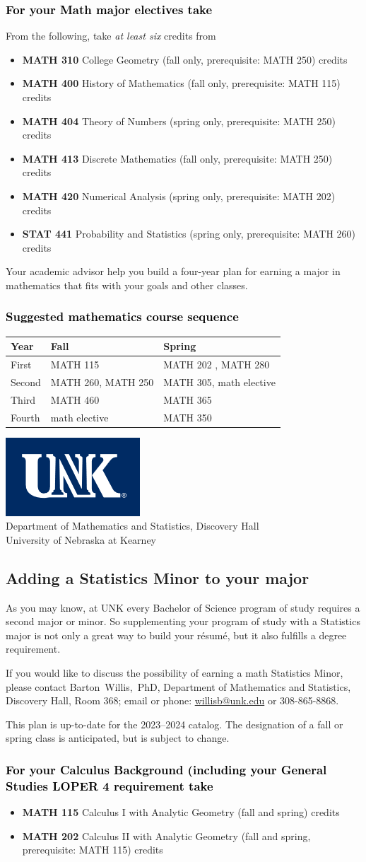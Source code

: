 \documentclass[11pt]{article}
\makeatletter
\newcommand{\calcone}{\textbf{MATH 115} Calculus I with Analytic Geometry (fall and spring) \dotfill 5 credits}
\newcommand{\calconeshort}{MATH 115}
\newcommand{\calctwo}{\textbf{MATH 202} Calculus II with Analytic Geometry (fall and spring, prerequisite: MATH 115) \dotfill 5 credits }
\newcommand{\calctwoshort}{MATH 202}
\newcommand{\foundationsshort}{MATH 250}
\newcommand{\calcthreeshort}{MATH 260}
\newcommand{\linearshort}{MATH 280}
\newcommand{\discrete}{\textbf{MATH 413} Discrete Mathematics  (fall only, prerequisite: MATH 250)\dotfill 3 credits}
\newcommand{\statistics}{\textbf{STAT 441} Probability and Statistics (spring only, prerequisite: MATH 260)  \dotfill  3 credits}
\newcommand{\diffeqshort}{MATH 305}
\newcommand{\abstractalgebrashort}{MATH 350}
\newcommand{\complexshort}{MATH 365}
\newcommand{\advancedcalcshort}{MATH 460}
\newcommand{\numerical}{\textbf{MATH 420}   Numerical Analysis   (spring only, prerequisite: MATH 202)\dotfill 3 credits}
\newcommand{\collegegeometry}{\textbf{MATH 310}	College Geometry (fall only,  prerequisite: MATH 250) \dotfill 3 credits}
\newcommand{\mathhistory}{\textbf{MATH 400} History of Mathematics (fall only,  prerequisite: MATH 115) \dotfill 3 credits}
\newcommand{\numbertheory}{\textbf{MATH 404} Theory of Numbers (spring only,  prerequisite: MATH 250) \dotfill 3 credits}
\newcommand{\contactbw}{\mbox{Barton Willis, PhD}, Department of Mathematics and Statistics,  Discovery Hall, Room 368;
email or phone: \href{mailto:willisb@unk.edu}{willisb@unk.edu} or 308-865-8868.}
\newcommand{\forinfo}[2]{If you would like to discuss the possibility of earning a math {#1}, please contact \contactbw}
\newcommand{\catalog}{2023--2024 }
\newcommand{\LOPER}{LOPER\xspace}
\newcommand{\uptodate}{This plan is up-to-date for  the \catalog catalog. The designation of a fall or spring class is 
anticipated, but  is subject to change.}
\newcommand{\myheading}{
\begin{flushleft}
\includegraphics[scale=0.35]{unk-logo}\\
\setcounter{footnote}{0}
\vspace{0.25in}
 \textcolor{unkblue}{Department of Mathematics and Statistics, Discovery Hall} \\
  \textcolor{unkblue}{University of Nebraska at Kearney}
\end{flushleft}}
\newcommand{\mathBS}{
     \begin{center}
         \begin{tabular}[h]{| l | l | l|} 
            \hline
            \textbf{Year}           & \textbf{Fall}         &  \textbf{Spring}  \\ \hline 
            First & \calconeshort{}  & \calctwoshort{} , \linearshort  \\  \hline
            Second &  \calcthreeshort{}, \foundationsshort & \diffeqshort, math elective \\ \hline
            Third & \advancedcalcshort              &  \complexshort{}\\ \hline
            Fourth & math elective &  \abstractalgebrashort  \\ \hline
         \end{tabular}
\end{center}}
\makeatother
\begin{document}
\subsubsection*{\textcolor{black}{For your Math major electives take}}
From the following, take \emph{at least six} credits from
\begin{itemize}
\item \collegegeometry
\item \mathhistory
\item \numbertheory
\item \discrete
\item \numerical
\item \statistics
\end{itemize}
\vspace{0.0in}
\noindent Your academic advisor help you build a four-year plan for earning a 
major in mathematics that fits with your goals and other classes.

\subsubsection*{\textcolor{black}{Suggested mathematics course sequence}}

\mathBS

\newpage 
\myheading
\subsection*{\textbf{\textcolor{unkblue}{Adding a Statistics Minor to your major}}}



As you may know, at UNK every Bachelor of Science program of study requires a second
major or minor. So supplementing your  program of study with a Statistics major is not only a great
way to build your r\'esum\'e, but it also fulfills a degree requirement.

\forinfo{Statistics Minor}{}

\uptodate

\vspace{-0.1in}

\subsubsection*{\textcolor{black}{For your Calculus Background (including your General Studies \LOPER 4 requirement take}}
\begin{itemize}
\item  \calcone
\item \calctwo
\end{itemize}
\end{document}

